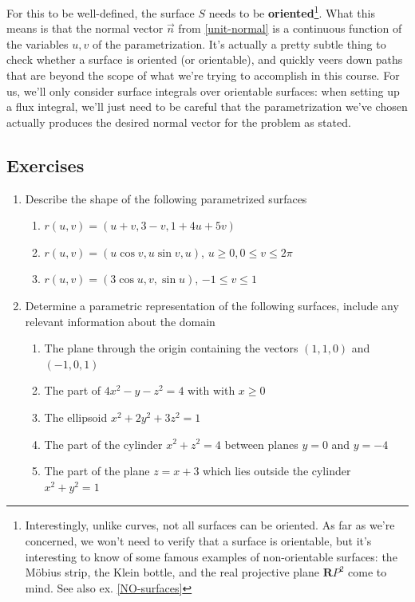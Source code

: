 \documentclass[12pt]{article}
\numberwithin{equation}{subsection}
\numberwithin{figure}{subsection}
\theoremstyle{note}
\begin{document}
{For this to be well-defined, the surface $S$ needs to be \textbf{oriented}\footnote{Interestingly, unlike curves, not all surfaces can be oriented. As far as we're concerned, we won't need to verify that a surface is orientable, but it's interesting to know of some famous examples of non-orientable surfaces: the M\"obius strip, the Klein bottle, and the real projective plane $\mathbf{R}P^2$ come to mind. See also ex. \ref{NO-surfaces}}. What this means is that the normal vector $\vec{n}$ from \eqref{unit-normal} is a continuous function of the variables $u,v$ of the parametrization. It's actually a pretty subtle thing to check whether a surface is oriented (or orientable), and quickly veers down paths that are beyond the scope of what we're trying to accomplish in this course. For us, we'll only consider surface integrals over orientable surfaces: when setting up a flux integral, we'll just need to be careful that the parametrization we've chosen actually produces the desired normal vector for the problem as stated. 


\subsection{Exercises}
\begin{enumerate}[label=\arabic*.]
\item Describe the shape of the following parametrized surfaces

\begin{enumerate}
	\item $r(u,v)=(u+v, 3-v, 1+4u+5v)$
	\item $r(u,v)=(u \cos v, u \sin v, u)$, $u\geq 0, 0\leq v\leq 2\pi$
	\item $r(u,v)=(3\cos u, v, \sin u)$, $-1\leq v\leq 1$
\end{enumerate}

\item Determine a parametric representation of the following surfaces, include any relevant information about the domain

\begin{enumerate}
	\item The plane through the origin containing the vectors $(1,1,0)$ and $(-1,0,1)$
	\item The part of $4x^2-y-z^2=4$ with with $x\geq 0$
	\item The ellipsoid $x^2+2y^2+3z^2=1$
	\item The part of the cylinder $x^2+z^2=4$ between planes $y=0$ and $y=-4$
	\item The part of the plane $z=x+3$ which lies outside the cylinder $x^2+y^2=1$
\end{enumerate}


\end{enumerate}}
\end{document}
